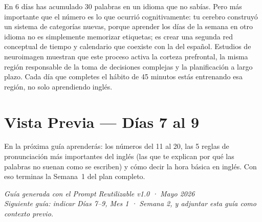 \noindent
En 6 días has acumulado 30 palabras en un idioma que no sabías.
Pero más importante que el número es lo que ocurrió cognitivamente:
tu cerebro construyó un sistema de categorías nuevas, porque aprender
los días de la semana en otro idioma no es simplemente memorizar
etiquetas; es crear una segunda red conceptual de tiempo y calendario
que coexiste con la del español.  Estudios de neuroimagen muestran que
este proceso activa la corteza prefrontal, la misma región responsable
de la toma de decisiones complejas y la planificación a largo plazo.
Cada día que completes el hábito de 45 minutos estás entrenando esa
región, no solo aprendiendo inglés.

\section*{Vista Previa — Días 7 al 9}
\label{sec:preview_dia7_9}

\noindent
En la próxima guía aprenderás: los números del 11 al 20,
las 5 reglas de pronunciación más importantes del inglés
(las que te explican por qué las palabras no suenan como se
escriben) y cómo decir la hora básica en inglés.
Con eso terminas la Semana~1 del plan completo.

\bigskip
\begin{center}
  \small\itshape
  Guía generada con el Prompt Reutilizable v1.0 · Mayo 2026 \\
  Siguiente guía: indicar Días 7--9, Mes 1 · Semana 2,
  y adjuntar esta guía como contexto previo.
\end{center}

